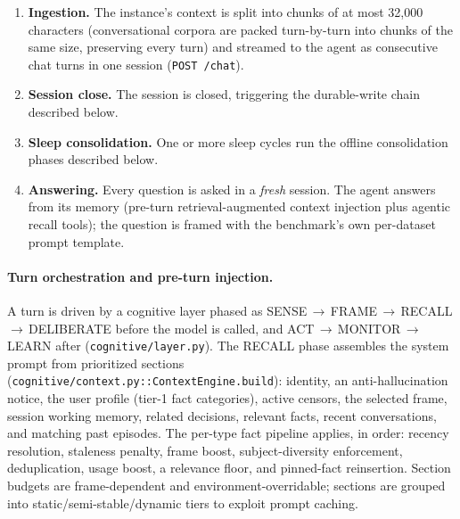\documentclass{article}
\begin{document}
\begin{enumerate}
  \item \textbf{Ingestion.} The instance's context is split into chunks of at
        most 32{,}000 characters (conversational corpora are packed
        turn-by-turn into chunks of the same size, preserving every turn) and
        streamed to the agent as consecutive chat turns in one session
        (\texttt{POST /chat}).
  \item \textbf{Session close.} The session is closed, triggering the
        durable-write chain described below.
  \item \textbf{Sleep consolidation.} One or more sleep cycles run the
        offline consolidation phases described below.
  \item \textbf{Answering.} Every question is asked in a \emph{fresh} session.
        The agent answers from its memory (pre-turn retrieval-augmented
        context injection plus agentic recall tools); the question is framed
        with the benchmark's own per-dataset prompt template.
\end{enumerate}

\paragraph{Turn orchestration and pre-turn injection.}
A turn is driven by a cognitive layer phased as
SENSE\,$\to$\,FRAME\,$\to$\,RECALL\,$\to$\,DELIBERATE before the model is
called, and ACT\,$\to$\,MONITOR\,$\to$\,LEARN after
(\texttt{cognitive/layer.py}). The RECALL phase assembles the system prompt
from prioritized sections (\texttt{cognitive/context.py::ContextEngine.build}):
identity, an anti-hallucination notice, the user profile (tier-1 fact
categories), active censors, the selected frame, session working memory,
related decisions, relevant facts, recent conversations, and matching past
episodes. The per-type fact pipeline applies, in order: recency resolution,
staleness penalty, frame boost, subject-diversity enforcement, deduplication,
usage boost, a relevance floor, and pinned-fact reinsertion. Section budgets
are frame-dependent and environment-overridable; sections are grouped into
static/semi-stable/dynamic tiers to exploit prompt caching.
\end{document}

